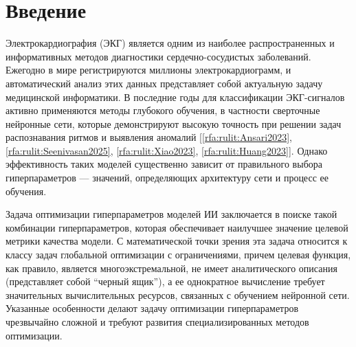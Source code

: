 \documentclass[10pt,a4paper]{book}
\begin{document}
\MakeArticleHeader



\section{Введение}
\label{sec-intro}

Электрокардиография (ЭКГ) является одним из наиболее распространенных и информативных методов диагностики сердечно-сосудистых заболеваний. Ежегодно в мире регистрируются миллионы электрокардиограмм, и автоматический анализ этих данных представляет собой актуальную задачу медицинской информатики. В последние годы для классификации ЭКГ-сигналов активно применяются методы глубокого обучения, в частности сверточные нейронные сети, которые демонстрируют высокую точность при решении задач распознавания ритмов и выявления аномалий [\ref{rfa:rulit:Ansari2023}, \ref{rfa:rulit:Seenivasan2025}, \ref{rfa:rulit:Xiao2023}, \ref{rfa:rulit:Huang2023}]. Однако эффективность таких моделей существенно зависит от правильного выбора гиперпараметров --- значений, определяющих архитектуру сети и процесс ее обучения.

Задача оптимизации гиперпараметров моделей ИИ заключается в поиске такой комбинации гиперпараметров, которая обеспечивает наилучшее значение целевой метрики качества модели. С математической точки зрения эта задача относится к классу задач глобальной оптимизации с ограничениями, причем целевая функция, как правило, является многоэкстремальной, не имеет аналитического описания (представляет собой ``черный ящик''), а ее однократное вычисление требует значительных вычислительных ресурсов, связанных с обучением нейронной сети. Указанные особенности делают задачу оптимизации гиперпараметров чрезвычайно сложной и требуют развития специализированных методов оптимизации.
\end{document}
